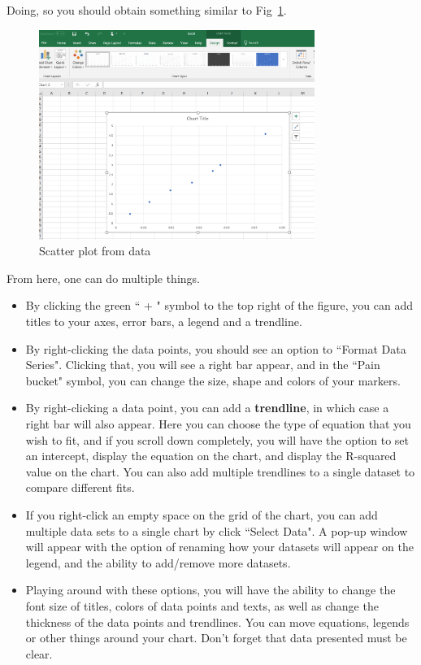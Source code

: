 \documentclass[12pt]{report}
\begin{document}
Doing, so you should obtain something similar to Fig~\ref{Fig:Excel-fig}.
\begin{figure}[h]
\centering
\includegraphics[width=0.8\textwidth]{Excel-fig}
\caption{Scatter plot from data}
\label{Fig:Excel-fig}
\end{figure}
From here, one can do multiple things. 
\begin{itemize}
\item By clicking the green `` + " symbol to the top right of the figure, you can add titles to your axes, error bars, a legend and a trendline.
\item By right-clicking the data points, you should see an option to ``Format Data Series". Clicking that, you will see a right bar appear, and in the ``Pain bucket" symbol, you can change the size, shape and colors of your markers.
\item By right-clicking a data point, you can add a \textbf{trendline}, in which case a right bar will also appear. Here you can choose the type of equation that you wish to fit, and if you scroll down completely, you will have the option to set an intercept, display the equation on the chart, and display the R-squared value on the chart. You can also add multiple trendlines to a single dataset to compare different fits.
\item If you right-click an empty space on the grid of the chart, you can add multiple data sets to a single chart by click ``Select Data". A pop-up window will appear with the option of renaming how your datasets will appear on the legend, and the ability to add/remove more datasets.
\item Playing around with these options, you will have the ability to change the font size of titles, colors of data points and texts, as well as change the thickness of the data points and trendlines. You can move equations, legends or other things around your chart. Don't forget that data presented must be clear.
\end{itemize}
\end{document}
